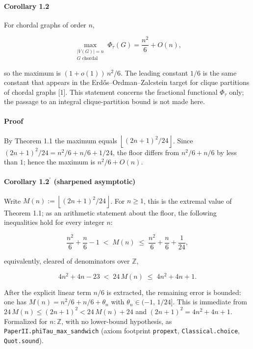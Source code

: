 \documentclass[
  american,
  11pt,
  a4paper,
]{article}
\begin{document}
\paragraph{Corollary 1.2}\label{corollary-1.2}

For chordal graphs of order \(n\),

\[
\max_{\substack{|V(G)|=n\\G\text{ chordal}}}\Phi_\tau(G)=\frac{n^2}{6}+O(n),
\]

so the maximum is \((1+o(1))\,n^2/6\). The leading constant \(1/6\) is the same constant that
appears in the Erdős--Ordman--Zalcstein target for clique partitions of chordal graphs {[}1{]}. This
statement concerns the fractional functional \(\Phi_\tau\) only; the passage to an integral
clique-partition bound is not made here.

\paragraph{Proof}\label{proof}

By Theorem 1.1 the maximum equals \(\left\lfloor(2n+1)^2/24\right\rfloor\). Since
\((2n+1)^2/24=n^2/6+n/6+1/24\), the floor differs from \(n^2/6+n/6\) by less than \(1\); hence the
maximum is \(n^2/6+O(n)\).

\paragraph{\texorpdfstring{Corollary 1.2\(^{\prime}\) (sharpened asymptotic)}{Corollary 1.2\^{}\{\textbackslash prime\} (sharpened asymptotic)}}\label{corollary-1.2prime-sharpened-asymptotic}

Write \(M(n):=\left\lfloor(2n+1)^2/24\right\rfloor\). For \(n\ge1\), this is the extremal value of Theorem 1.1; as an arithmetic statement about the floor, the following inequalities hold for every integer \(n\):

\[
\frac{n^2}{6}+\frac{n}{6}-1
\;<\;
M(n)
\;\le\;
\frac{n^2}{6}+\frac{n}{6}+\frac{1}{24},
\]

equivalently, cleared of denominators over \(\mathbb Z\),

\[
4n^2+4n-23 \;<\; 24\,M(n) \;\le\; 4n^2+4n+1.
\]

After the explicit linear term \(n/6\) is extracted, the remaining error is bounded: one has
\(M(n)=n^2/6+n/6+\theta_n\) with \(\theta_n\in(-1,\,1/24]\). This is immediate from
\(24\,M(n)\le(2n+1)^2<24\,M(n)+24\) and \((2n+1)^2=4n^2+4n+1\). Formalized for \(n:\mathbb Z\), with no lower-bound hypothesis, as
\texttt{PaperII.phiTau\_max\_sandwich} (axiom footprint \texttt{propext}, \texttt{Classical.choice}, \texttt{Quot.sound}).
\end{document}
